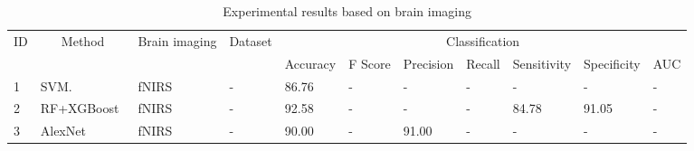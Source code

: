 \begin{table*}
\centering
\caption{Experimental results based on brain imaging}
\label{tab3}
\begin{tabular}{l|l|l|l|lllllll}

\hline
\multicolumn{1}{c|}{\multirow{2}{*}{ID}} & \multicolumn{1}{c|}{\multirow{2}{*}{Method}}                         & \multicolumn{1}{c|}{\multirow{2}{*}{Brain imaging}} & \multicolumn{1}{c|}{\multirow{2}{*}{Dataset}} & \multicolumn{7}{c}{Classification}                                                                                                                                                                                            \\
\multicolumn{1}{c|}{}                    & \multicolumn{1}{c|}{}                                                & \multicolumn{1}{c|}{}                               & \multicolumn{1}{c|}{}                         & \multicolumn{1}{c}{Accuracy} & \multicolumn{1}{c}{F Score} & \multicolumn{1}{c}{Precision} & \multicolumn{1}{c}{Recall} & \multicolumn{1}{c}{Sensitivity} & \multicolumn{1}{c}{Specificity} & \multicolumn{1}{c}{AUC} \\
\hline
1                                       & SVM.~\cite{2015Automatic}           & fNIRS                                              & -                                            & 86.76                        & -                            & -                             & -                          & -                               & -                               & -                       \\
2                                       & RF+XGBoost~\cite{2020Classifying}           & fNIRS                                              & -                                            & 92.58                        & -                            & -                             & -                          & 84.78                           & 91.05                           & -                       \\
3                                       & AlexNet~\cite{2021Depression}                 & fNIRS                                              & -                                            & 90.00                        & -                            & 91.00                         & -                          & -                               & -                               & -                       \\

\end{tabular}
\end{table*}
